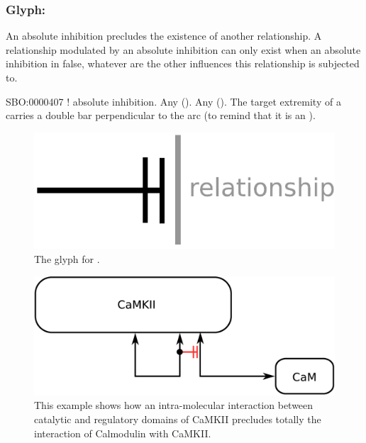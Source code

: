 \color{ForestGreen}

\subsubsection{Glyph: }\label{sec:absoluteInhibition}

An absolute inhibition precludes the existence of another relationship. A relationship modulated by an absolute inhibition can only exist when an absolute inhibition in false, whatever are the other influences this relationship is subjected to.

\begin{glyphDescription}
 \glyphSboTerm SBO:0000407 ! absolute inhibition.
 \glyphOrigin Any  ().
 \glyphTarget Any  ().
 \glyphEndPoint The target extremity of a  carries a double bar perpendicular to the arc (to remind that it is an ).
 \end{glyphDescription}

\begin{figure}[H]
  \centering
  \includegraphics[scale = 0.5]{images/absoluteInhibition}
  \caption{The \PD glyph for .}
  \label{fig:absoluteInhibition}
\end{figure}

\begin{figure}[H]
  \centering
  \includegraphics[scale = 0.5]{examples/ex-absoluteInhibition}
  \caption{This example shows how an intra-molecular interaction between catalytic and regulatory domains of CaMKII precludes totally the interaction of Calmodulin with CaMKII.}
  \label{fig:ex-absoluteInhibition}
\end{figure}

\normalcolor